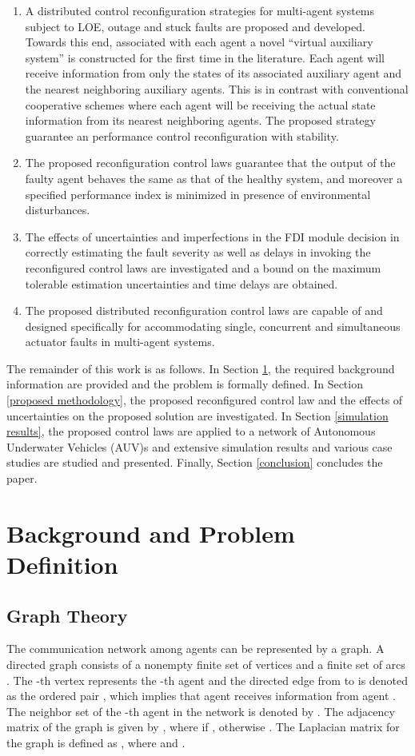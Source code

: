 \documentclass[12pt,draftcls,onecolumn]{IEEEtran}
\begin{document}
 \begin{enumerate}
 	\item [1)] A distributed control reconfiguration strategies for multi-agent systems subject to  LOE, outage and stuck faults are proposed and developed. Towards this end, associated with each agent a novel ``virtual auxiliary system'' is constructed for the first time in the literature. Each agent will receive information from {only} the states of its associated auxiliary agent and the nearest neighboring auxiliary agents. This is in contrast with conventional cooperative schemes where each agent will be receiving the actual state information from its nearest neighboring agents. The proposed strategy guarantee an  performance control reconfiguration with stability.
\item [2)] The proposed  reconfiguration control  laws  guarantee that 
	the output of the faulty agent behaves the same  as that of the healthy system, and  moreover a specified  performance index  is minimized  in presence of environmental disturbances.
 	\item [3)] The effects of  uncertainties and imperfections in the FDI module decision in correctly estimating the fault severity as well as delays in invoking the reconfigured control laws are investigated and a bound on the maximum tolerable estimation uncertainties and time delays are obtained.
 	\item [4)] The proposed distributed  reconfiguration control laws are capable of and designed specifically for accommodating single, concurrent and simultaneous actuator faults in multi-agent systems.
 \end{enumerate}
The remainder of this work is as follows. In Section \ref{section2}, the required background information are provided and the problem is formally defined. In Section \ref{proposed methodology}, the proposed reconfigured control law and the effects of uncertainties on the proposed solution are investigated. In Section \ref{simulation results}, the proposed control laws are applied to a network of Autonomous  Underwater Vehicles (AUV)s and extensive simulation results and various case studies are studied and presented. Finally, Section  \ref{conclusion} concludes the paper.
\section{ Background and Problem Definition}\label{section2}
\subsection{Graph Theory}\label{subsection 1.1}
 The communication network among  agents can be represented by a graph. A directed graph  consists of a nonempty finite set of vertices  and a finite set of arcs . The -{th} vertex represents the -{th} agent and the directed edge from  to  is denoted as the ordered pair , which implies that agent  receives information from agent . The neighbor set of the -th agent  in the network is denoted by . 
The adjacency matrix of the graph  is given by , where  if , otherwise . The Laplacian matrix for the graph  is defined as , where  and . 
\end{document}
